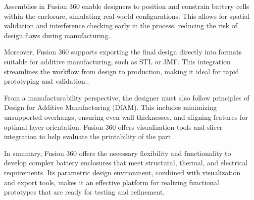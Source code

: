 Assemblies in Fusion 360 enable designers to position and constrain battery cells within the enclosure, simulating real-world configurations. This allows for spatial validation and interference checking early in the process, reducing the risk of design flaws during manufacturing\cite{hogan2025}..

Moreover, Fusion 360 supports exporting the final design directly into formats suitable for additive manufacturing, such as STL or 3MF. This integration streamlines the workflow from design to production, making it ideal for rapid prototyping and validation\cite{hogan2025}..

From a manufacturability perspective, the designer must also follow principles of Design for Additive Manufacturing (DfAM). This includes minimizing unsupported overhangs, ensuring even wall thicknesses, and aligning features for optimal layer orientation. Fusion 360 offers visualization tools and slicer integration to help evaluate the printability of the part \cite{anderson2020}.

In summary, Fusion 360 offers the necessary flexibility and functionality to develop complex battery enclosures that meet structural, thermal, and electrical requirements. Its parametric design environment, combined with visualization and export tools, makes it an effective platform for realizing functional prototypes that are ready for testing and refinement.

